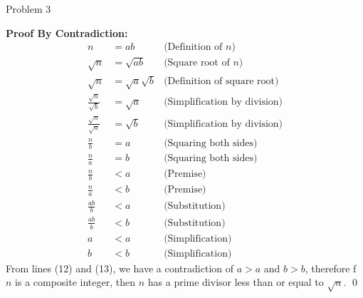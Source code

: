 \begin{problem}{Problem 3}
\begin{Highlight}
        \noindent \textbf{Proof By Contradiction:}
        \begin{align}
            n & = ab & \text{(Definition of $n$)} \\
            \sqrt{n} & = \sqrt{ab} & \text{(Square root of $n$)} \\
            \sqrt{n} & = \sqrt{a}\sqrt{b} & \text{(Definition of square root)} \\
            \frac{\sqrt{n}}{\sqrt{b}} & = \sqrt{a} & \text{(Simplification by division)} \\
            \frac{\sqrt{n}}{\sqrt{a}} & = \sqrt{b} & \text{(Simplification by division)} \\
            \frac{n}{b} & = a & \text{(Squaring both sides)} \\
            \frac{n}{a} & = b & \text{(Squaring both sides)} \\
            \frac{n}{b} & < a & \text{(Premise)} \\
            \frac{n}{a} & < b & \text{(Premise)} \\
            \frac{ab}{b} & < a & \text{(Substitution)} \\
            \frac{ab}{b} & < b & \text{(Substitution)} \\
            a & < a & \text{(Simplification)} \\
            b & < b & \text{(Simplification)}
        \end{align}
        From lines (12) and (13), we have a contradiction of $a > a$ and $b > b$, therefore f $n$ is a composite integer, then $n$ has a prime divisor less than or equal to $\sqrt{n}$. \qed
    \end{Highlight}
\end{problem}

